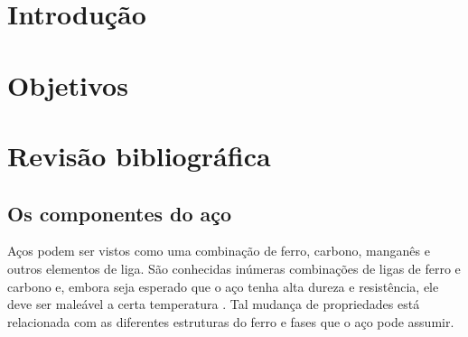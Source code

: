 \documentclass[brazil,dissertacao,epusp]{usp}
\begin{document}





\resumole{}


\elementospretextuais  %

\setlength\parindent{.85cm}  %

\chapter{Introdução}

\chapter{Objetivos}

\chapter{Revisão bibliográfica}

\section{Os componentes do aço}

Aços podem ser vistos como uma combinação de ferro, carbono, manganês e outros elementos de liga. São conhecidas inúmeras combinações de ligas de ferro e carbono e, embora seja esperado que o aço tenha alta dureza e resistência, ele deve ser maleável a certa temperatura \cite{Dossett2006}. Tal mudança de propriedades está relacionada com as diferentes estruturas do ferro e fases que o aço pode assumir.
\end{document}
